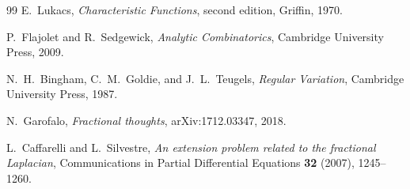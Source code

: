 \documentclass[11pt,oneside]{article}
\theoremstyle{definition}
\begin{document}
\begin{thebibliography}{99}
E.~Lukacs,
\emph{Characteristic Functions}, second edition,
Griffin, 1970.

P.~Flajolet and R.~Sedgewick,
\emph{Analytic Combinatorics},
Cambridge University Press, 2009.


N.~H.~Bingham, C.~M.~Goldie, and J.~L.~Teugels,
\emph{Regular Variation},
Cambridge University Press, 1987.

N.~Garofalo,
\emph{Fractional thoughts},
arXiv:1712.03347, 2018.

L.~Caffarelli and L.~Silvestre,
\emph{An extension problem related to the fractional Laplacian},
Communications in Partial Differential Equations \textbf{32} (2007), 1245--1260.

\end{thebibliography}
\end{document}
